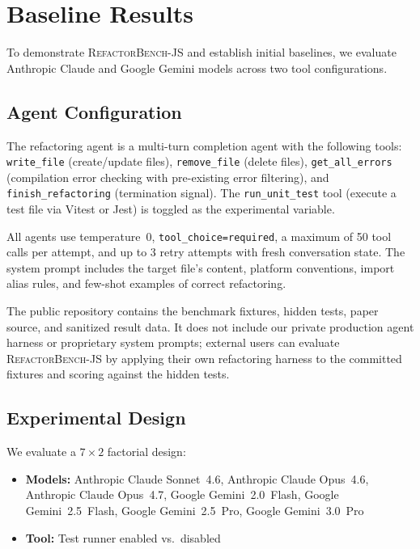 \documentclass[11pt,letterpaper]{article}
\begin{document}
\section{Baseline Results}
\label{sec:baselines}

To demonstrate \textsc{RefactorBench}-JS and establish initial baselines, we evaluate Anthropic Claude and Google Gemini models across two tool configurations.

\subsection{Agent Configuration}

The refactoring agent is a multi-turn completion agent with the following tools: \texttt{write\_file} (create/update files), \texttt{remove\_file} (delete files), \texttt{get\_all\_errors} (compilation error checking with pre-existing error filtering), and \texttt{finish\_refactoring} (termination signal). The \texttt{run\_unit\_test} tool (execute a test file via Vitest or Jest) is toggled as the experimental variable.

All agents use temperature~0, \texttt{tool\_choice=required}, a maximum of 50 tool calls per attempt, and up to 3 retry attempts with fresh conversation state. The system prompt includes the target file's content, platform conventions, import alias rules, and few-shot examples of correct refactoring.

The public repository contains the benchmark fixtures, hidden tests, paper source, and sanitized result data. It does not include our private production agent harness or proprietary system prompts; external users can evaluate \textsc{RefactorBench}-JS by applying their own refactoring harness to the committed fixtures and scoring against the hidden tests.

\subsection{Experimental Design}

We evaluate a $7 \times 2$ factorial design:

\begin{itemize}[leftmargin=2em]
\item \textbf{Models:} Anthropic Claude Sonnet~4.6, Anthropic Claude Opus~4.6, Anthropic Claude Opus~4.7, Google Gemini~2.0~Flash, Google Gemini~2.5~Flash, Google Gemini~2.5~Pro, Google Gemini~3.0~Pro
\item \textbf{Tool:} Test runner enabled vs.\ disabled
\end{itemize}
\end{document}
